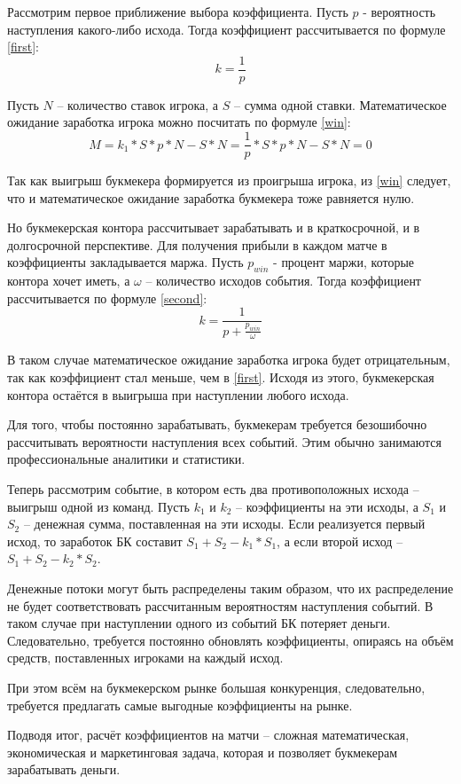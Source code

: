 Рассмотрим первое приближение выбора коэффициента. Пусть $p$ - вероятность наступления какого-либо исхода. Тогда коэффициент рассчитывается по формуле \ref{first}: 
\begin{equation}\label{first}
k = \frac{1}{p}
\end{equation}

Пусть $N$ -- количество ставок игрока, а $S$ -- сумма одной ставки. Математическое ожидание заработка игрока можно посчитать по формуле \ref{win}:
\begin{equation}\label{win} 
M = k_1 * S * p * N - S * N = \frac{1}{p} * S * p * N - S * N = 0
\end{equation}

Так как выигрыш букмекера формируется из проигрыша игрока, из \ref{win} следует, что и математическое ожидание заработка букмекера тоже равняется нулю.

Но букмекерская контора рассчитывает зарабатывать и в краткосрочной, и в долгосрочной перспективе. Для получения прибыли в каждом матче в коэффициенты закладывается маржа. Пусть $p_{win}$ - процент маржи, которые контора хочет иметь, а $\omega$ -- количество исходов события. Тогда коэффициент рассчитывается по формуле \ref{second}:
\begin{equation}\label{second}
k = \frac{1}{p + \frac{p_{win}}{\omega}}
\end{equation}

В таком случае математическое ожидание заработка игрока будет отрицательным, так как коэффициент стал меньше, чем в \ref{first}. Исходя из этого, букмекерская контора остаётся в выигрыша при наступлении любого исхода.

Для того, чтобы постоянно зарабатывать, букмекерам требуется безошибочно рассчитывать вероятности наступления всех событий. 
Этим обычно занимаются профессиональные аналитики и статистики.

Теперь рассмотрим событие, в котором есть два противоположных исхода -- выигрыш одной из команд. Пусть $k_1$ и $k_2$ -- коэффициенты на эти исходы, а $S_1$ и $S_2$ -- денежная сумма, поставленная на эти исходы. 
Если реализуется первый исход, то заработок БК составит $S_1 + S_2 - k_1 * S_1$, а если второй исход -- 
$S_1 + S_2 - k_2 * S_2$. 

Денежные потоки могут быть распределены таким образом, что их распределение не будет соответствовать рассчитанным вероятностям наступления событий. 
В таком случае при наступлении одного из событий БК потеряет деньги.
Следовательно, требуется постоянно обновлять коэффициенты, опираясь на объём средств, поставленных игроками на каждый исход.

При этом всём на букмекерском рынке большая конкуренция, следовательно, требуется предлагать самые выгодные коэффициенты на рынке.

Подводя итог, расчёт коэффициентов на матчи -- сложная математическая, экономическая и маркетинговая задача, которая и позволяет букмекерам зарабатывать деньги.